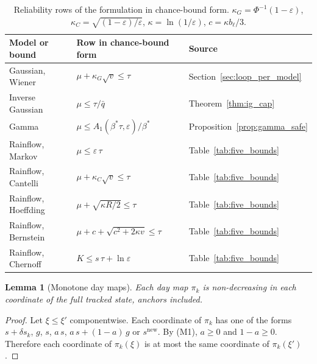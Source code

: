 \documentclass[11pt,a4paper]{article}
\theoremstyle{plain}
\newtheorem{lemma}[theorem]{Lemma}
\theoremstyle{definition}
\theoremstyle{remark}
\begin{document}
\begin{table}[htbp]
\centering
\caption{Reliability rows of the formulation in chance-bound form.
$\kappa_G = \Phi^{-1}(1-\varepsilon)$, $\kappa_C = \sqrt{(1-\varepsilon)/\varepsilon}$, $\kappa = \ln(1/\varepsilon)$, $c = \kappa b_\ell/3$.}
\label{tab:chance_rows}
\small
\begin{tabular}{@{}lll@{}}
\toprule
\textbf{Model or bound} & \textbf{Row in chance-bound form} & \textbf{Source} \\
\midrule
Gaussian, Wiener      & $\mu + \kappa_G\sqrt{v} \le \tau$ & Section~\ref{sec:loop_per_model} \\
Inverse Gaussian      & $\mu \le \tau/\bar q$ & Theorem~\ref{thm:ig_cap} \\
Gamma                 & $\mu \le A_1(\beta^*\tau,\varepsilon)/\beta^*$ & Proposition~\ref{prop:gamma_safe} \\
Rainflow, Markov      & $\mu \le \varepsilon\,\tau$ & Table~\ref{tab:five_bounds} \\
Rainflow, Cantelli    & $\mu + \kappa_C\sqrt{v} \le \tau$ & Table~\ref{tab:five_bounds} \\
Rainflow, Hoeffding   & $\mu + \sqrt{\kappa R/2} \le \tau$ & Table~\ref{tab:five_bounds} \\
Rainflow, Bernstein   & $\mu + c + \sqrt{c^2 + 2\kappa v} \le \tau$ & Table~\ref{tab:five_bounds} \\
Rainflow, Chernoff    & $K \le s\,\tau + \ln\varepsilon$ & Table~\ref{tab:five_bounds} \\
\bottomrule
\end{tabular}
\end{table}

\begin{lemma}[Monotone day maps]\label{lem:monotone}
Each day map $\pi_k$ is non-decreasing in each coordinate of the full tracked state, anchors included.
\end{lemma}
\begin{proof}
Let $\xi \le \xi'$ componentwise.
Each coordinate of $\pi_k$ has one of the forms $s + \delta s_k$, $g$, $s$, $a\,s$, $a\,s + (1-a)\,g$ or $s^{\mathrm{new}}$.
By (M1), $a \ge 0$ and $1 - a \ge 0$.
Therefore each coordinate of $\pi_k(\xi)$ is at most the same coordinate of $\pi_k(\xi')$.
\end{proof}
\end{document}

